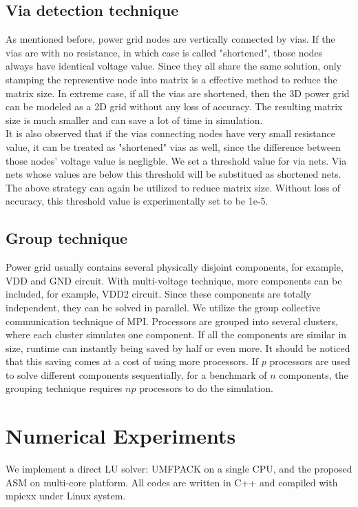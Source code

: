 \documentclass{sig-alternate}
\begin{document}
  \subsection{Via detection technique}
	As mentioned before, power grid nodes are vertically connected by vias. If the vias are with no 
	resistance, in which case is called "shortened", those nodes always have identical voltage value. Since they all share the same
	solution, only stamping the representive
	node into matrix is a effective method to reduce the matrix size. In extreme case, if all the
	vias are shortened, then the 3D power grid can be modeled as a 2D grid without any loss of accuracy. The resulting matrix size
	is much smaller and can save a lot of time in simulation.\\ 
 
	It is also observed that if the vias connecting nodes have very small resistance value, it can be treated as "shortened" vias as
	well, since the difference between those nodes' voltage value is negligble. We set a threshold value for via nets. Via nets 
	whose values are below this threshold will be substitued as shortened nets. The above strategy can again be utilized to reduce 
	matrix size. Without loss of accuracy, this threshold value is experimentally set to be 1e-5.\\
 
  \subsection{Group technique} 
	Power grid usually contains several physically disjoint components, for example, VDD and GND circuit. With multi-voltage 
	technique, more components can be included, for example, VDD2 circuit. Since these components are totally independent, they can
	be solved in parallel. We utilize the group collective 
	communication technique of MPI. Processors are grouped into several clusters, where each cluster simulates one component. 
	If all the components are similar in size, runtime can instantly being saved by half or even more. 
	It should be noticed that this saving comes at a cost of using more processors. If $p$ processors are used to 
	solve different components sequentially, for a benchmark of $n$ components, the grouping technique requires $np$ processors to
	do the simulation. \\ 
 
\section{Numerical Experiments}
	We implement a direct LU solver: UMFPACK on a single CPU, and the proposed ASM on multi-core platform. 
	All codes are written in C++ and compiled with mpicxx under Linux system. 
\end{document}
